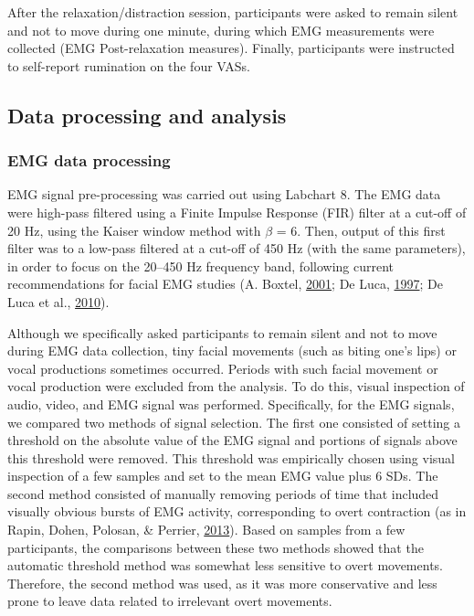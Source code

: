 \documentclass[a4paper,12pt,twoside,openright,oldfontcommands]{memoir}
\begin{document}
After the relaxation/distraction session, participants were asked to
remain silent and not to move during one minute, during which EMG
measurements were collected (EMG Post-relaxation measures). Finally,
participants were instructed to self-report rumination on the four VASs.

\subsection{Data processing and
analysis}\label{data-processing-and-analysis}

\subsubsection{EMG data processing}\label{emg-data-processing}

EMG signal pre-processing was carried out using Labchart 8. The EMG data
were high-pass filtered using a Finite Impulse Response (FIR) filter at
a cut-off of 20 Hz, using the Kaiser window method with \(\beta\) = 6.
Then, output of this first filter was to a low-pass filtered at a
cut-off of 450 Hz (with the same parameters), in order to focus on the
20--450 Hz frequency band, following current recommendations for facial
EMG studies (A. Boxtel,
\protect\hyperlink{ref-boxtel_optimal_2001}{2001}; De Luca,
\protect\hyperlink{ref-de_luca_use_1997}{1997}; De Luca et al.,
\protect\hyperlink{ref-de_luca_filtering_2010}{2010}).

Although we specifically asked participants to remain silent and not to
move during EMG data collection, tiny facial movements (such as biting
one's lips) or vocal productions sometimes occurred. Periods with such
facial movement or vocal production were excluded from the analysis. To
do this, visual inspection of audio, video, and EMG signal was
performed. Specifically, for the EMG signals, we compared two methods of
signal selection. The first one consisted of setting a threshold on the
absolute value of the EMG signal and portions of signals above this
threshold were removed. This threshold was empirically chosen using
visual inspection of a few samples and set to the mean EMG value plus 6
SDs. The second method consisted of manually removing periods of time
that included visually obvious bursts of EMG activity, corresponding to
overt contraction (as in Rapin, Dohen, Polosan, \& Perrier,
\protect\hyperlink{ref-rapin_emg_2013}{2013}). Based on samples from a
few participants, the comparisons between these two methods showed that
the automatic threshold method was somewhat less sensitive to overt
movements. Therefore, the second method was used, as it was more
conservative and less prone to leave data related to irrelevant overt
movements.
\end{document}
